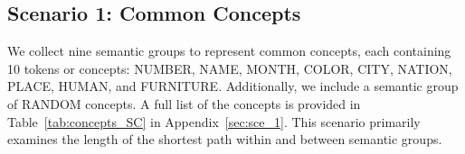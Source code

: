 

\subsection{Scenario 1: Common Concepts}
We collect nine semantic groups to represent common concepts, each containing 10 tokens or concepts: NUMBER, NAME, MONTH, COLOR, CITY, NATION, PLACE, HUMAN, and FURNITURE. Additionally, we include a semantic group of RANDOM concepts. A full list of the concepts is provided in Table~\ref{tab:concepts_SC} in Appendix~\ref{sec:sce_1}. This scenario primarily examines the length of the shortest path within and between semantic groups.

